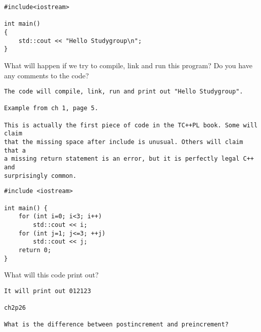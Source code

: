 \documentclass[landscape]{slides}
\begin{document}

\begin{slide}

\begin{lstlisting}
#include<iostream>

int main() 
{
    std::cout << "Hello Studygroup\n";
}
\end{lstlisting}

What will happen if we try to compile, link and run this program? 
Do you have any comments to the code?

\begin{note}
\begin{tiny}
\begin{verbatim}
The code will compile, link, run and print out "Hello Studygroup".

Example from ch 1, page 5. 

This is actually the first piece of code in the TC++PL book. Some will claim 
that the missing space after include is unusual. Others will claim that a
a missing return statement is an error, but it is perfectly legal C++ and
surprisingly common.
\end{verbatim}
\end{tiny}
\end{note}

\end{slide}


\begin{slide}

\begin{lstlisting}
#include <iostream>

int main() {
    for (int i=0; i<3; i++) 
        std::cout << i;
    for (int j=1; j<=3; ++j) 
        std::cout << j;
    return 0;
}
\end{lstlisting}

What will this code print out?

\begin{note}
\begin{tiny}
\begin{verbatim}
It will print out 012123

ch2p26

What is the difference between postincrement and preincrement?

\end{verbatim}
\end{tiny}
\end{note}

\end{slide}
\end{document}
